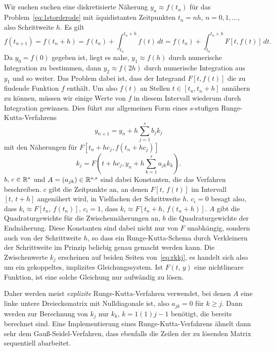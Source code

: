 \subsection{}

Wir suchen suchen eine diskretisierte Näherung $y_n \approx f(t_n)$
für das Problem~\eqref{eq:1storderode} mit
äquidistanten Zeitpunkten $t_n=n h$, $n=0,1,\ldots$, also Schrittweite
$h$. Es gilt
\begin{equation}
  f(t_{n+1}) = f(t_n+h) = f(t_n) + \int_{t_n}^{t_n+h} \dot f(t)\,dt
  =  f(t_n) + \int_{t_n}^{t_n+h} F[t, f(t)]\,dt.
\end{equation}
Da $y_0 = f(0)$ gegeben ist, liegt es nahe, $y_1 \approx f(h)$ durch
numerische Integration zu bestimmen, dann $y_2 \approx f(2h)$ durch
numerische Integration aus $y_1$ und so weiter. Das Problem dabei ist,
dass der Integrand $F[t, f(t)]$ die zu findende Funktion $f$
enthält. Um also $f(t)$ an Stellen $t\in [t_n, t_n + h]$ annähern zu
können, müssen wir einige Werte von $f$ in diesem Intervall wiederum
durch Integration gewinnen. Dies führt zur allgemeinen Form eines
$s$-stufigen Runge-Kutta-Verfahrens
\begin{equation}
  y_{n+1} = y_n + h\sum_{j=1}^s b_j k_j
\end{equation}
mit den Näherungen für $F[t_n + hc_j, f(t_n + h c_j)]$
\begin{equation}
  \label{eq:rkkj}
  k_j = F(t + h c_j, y_n + h \sum_{k=1}^s a_{jk} k_k).
\end{equation}
$b,\,c\in\mathbb{R}^s$ und $A=(a_{jk})\in\mathbb{R}^{s,s}$ sind dabei Konstanten,
die das Verfahren beschreiben. $c$ gibt die Zeitpunkte an, an denen
$F[t,\,f(t)]$ im Intervall $[t,\,t+h]$ angenähert wird, in Vielfachen
der Schrittweite $h$. $c_i=0$ besagt also, dass $k_i\approx
F[t_n,\,f(t_n)]$, $c_i=1$, dass $k_i\approx F[t_n + h,\,f(t_n + h)]$.
$A$ gibt die Quadraturgewichte für die Zwischennäherungen an, $b$ die
Quadraturgewichte der Endnäherung. Diese Konstanten sind dabei nicht
nur von $F$ unabhängig, sondern auch von der Schrittweite $h$, so dass
ein Runge-Kutta-Schema durch Verkleinern der Schrittweite im Prinzip
beliebig genau gemacht werden kann.  Die Zwischenwerte $k_j$
erscheinen auf beiden Seiten von~\eqref{eq:rkkj}, es handelt sich also
um ein gekoppeltes, implizites Gleichungssystem.  Ist
$F(t,\,y)$ eine nichtlineare Funktion, ist eine solche Gleichung nur
aufwändig zu lösen.

%
Daher werden meist \emph{explizite} Runge-Kutta-Verfahren verwendet,
bei denen $A$ eine linke untere Dreiecksmatrix mit Nulldiagonale ist,
also $a_{jk} = 0$ für $k\ge j$. Dann werden zur Berechnung von $k_j$
nur $k_k$, $k=1(1)j-1$ benötigt, die bereits berechnet sind. Eine
Implementierung eines Runge-Kutta-Verfahrens ähnelt dann sehr dem
Gauß-Seidel-Verfahren, dass ebenfalls die Zeilen der zu lösenden
Matrix sequentiell abarbeitet.

